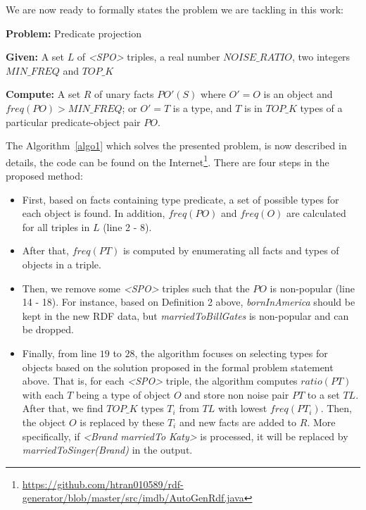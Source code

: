 \documentclass{acm_proc_article-sp}
\begin{document}
We are now ready to formally states the problem we are tackling in this work:

\begin{framed}
\textbf{Problem:} Predicate projection

\textbf{Given:} A set $L$ of \textit{<SPO>} triples, a real number $NOISE\_RATIO$, two integers $MIN\_FREQ$ and $TOP\_K$

\textbf{Compute:} A set $R$ of unary facts $PO'(S)$ where $O' = O$ is an object and $freq(PO) > MIN\_FREQ$; or $O' = T$ is a type, and $T$ is in $TOP\_K$ types of a particular predicate-object pair $PO$.
\end{framed}

The Algorithm~\ref{algo1} which solves the presented problem, is now described in details, the code can be found on the Internet\footnote{\url{https://github.com/htran010589/rdf-generator/blob/master/src/imdb/AutoGenRdf.java}}. There are four steps in the proposed method:
\begin{itemize}
\item First, based on facts containing type predicate, a set of possible types for each object is found. In addition, $freq(PO)$ and $freq(O)$ are calculated for all triples in $L$ (line 2 - 8).
\item After that, $freq(PT)$ is computed by enumerating all facts and types of objects in a triple.
\item Then, we remove some \textit{<SPO>} triples such that the $PO$ is non-popular (line 14 - 18). For instance, based on Definition 2 above, \textit{bornInAmerica} should be kept in the new RDF data, but \textit{marriedToBillGates} is non-popular and can be dropped.
\item Finally, from line $19$ to $28$, the algorithm focuses on selecting types for objects based on the solution proposed in the formal problem statement above. That is, for each \textit{<SPO>} triple, the algorithm computes $ratio(PT)$ with each $T$ being a type of object $O$ and store non noise pair $PT$ to a set $TL$. After that, we find $TOP\_K$ types $T_{i}$ from $TL$ with lowest $freq(PT_{i})$. Then, the object $O$ is replaced by these $T_{i}$ and new facts are added to $R$. More specifically, if \textit{<Brand marriedTo Katy>} is processed, it will be replaced by \textit{marriedToSinger(Brand)} in the output.
\end{itemize}
\end{document}
